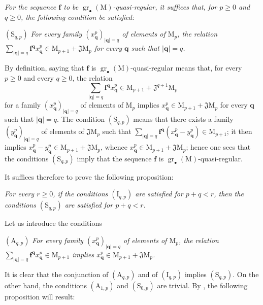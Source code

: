 \begin{env}[19.5.5.2]
\label{IV.19.5.5.2}
\emph{For the sequence $\mathbf{f}$ to be $\operatorname{gr}_\bullet(\mathrm{M})$-quasi-regular, it suffices that, for $p\geqslant 0$ and $q\geqslant 0$, the following condition be satisfied:}

$(\mathrm{S}_{q,p})$ \emph{For every family $(x_\mathbf{q}^p)_{|\mathbf{q}|=q}$ of elements of $\mathrm{M}_p$, the relation $\sum_{|\mathbf{q}|=q}\mathbf{f}^\mathbf{q} x_\mathbf{q}^p\in\mathrm{M}_{p+1}+\mathfrak{J}\mathrm{M}_p$ \emph{for every $\mathbf{q}$ such that $|\mathbf{q}|=q$.}}

By definition, saying that $\mathbf{f}$ is $\operatorname{gr}_\bullet(\mathrm{M})$-quasi-regular means that, for every $p\geqslant 0$ and every $q\geqslant 0$, the relation
\[
  \textstyle\sum_{|\mathbf{q}|=q}\mathbf{f}^\mathbf{q} x_\mathbf{q}^p\in\mathrm{M}_{p+1}+\mathfrak{J}^{q+1}\mathrm{M}_p
\]
for a family $(x_\mathbf{q}^p)_{|\mathbf{q}|=q}$ of elements of $\mathrm{M}_p$ implies $x_\mathbf{q}^p\in\mathrm{M}_{p+1}+\mathfrak{J}\mathrm{M}_p$ for every $\mathbf{q}$ such that $|\mathbf{q}|=q$. The condition $(\mathrm{S}_{q,p})$ means that there exists a family $(y_\mathbf{q}^p)_{|\mathbf{q}|=q}$ of elements of $\mathfrak{J}\mathrm{M}_p$ such that $\sum_{|\mathbf{q}|=q}\mathbf{f}^\mathbf{q}(x_\mathbf{q}^p-y_\mathbf{q}^p)\in\mathrm{M}_{p+1}$; it then implies $x_\mathbf{q}^p-y_\mathbf{q}^p\in\mathrm{M}_{p+1}+\mathfrak{J}\mathrm{M}_p$, whence $x_\mathbf{q}^p\in\mathrm{M}_{p+1}+\mathfrak{J}\mathrm{M}_p$; hence one sees that the conditions $(\mathrm{S}_{q,p})$ imply that the sequence $\mathbf{f}$ is $\operatorname{gr}_\bullet(\mathrm{M})$-quasi-regular.
\end{env}

It suffices therefore to prove the following proposition:

\begin{env}[19.5.5.3]
\label{IV.19.5.5.3}
\emph{For every $r\geqslant 0$, if the conditions $(\mathrm{I}_{q,p})$ are satisfied for $p+q<r$, then the conditions $(\mathrm{S}_{q,p})$ are satisfied for $p+q<r$.}

Let us introduce the conditions

$(\mathrm{A}_{q,p})$ \emph{For every family $(x_\mathbf{q}^p)_{|\mathbf{q}|=q}$ of elements of $\mathrm{M}_p$, the relation $\sum_{|\mathbf{q}|=q}\mathbf{f}^\mathbf{q} x_\mathbf{q}^p\in\mathrm{M}_{p+1}$ implies $x_\mathbf{q}^p\in\mathrm{M}_{p+1}+\mathfrak{J}\mathrm{M}_p$.}

It is clear that the conjunction of $(\mathrm{A}_{q,p})$ and of $(\mathrm{I}_{q,p})$ implies $(\mathrm{S}_{q,p})$. On the other hand, the conditions $(\mathrm{A}_{1,p})$ and $(\mathrm{S}_{0,p})$ are trivial. By , the following proposition will result:
\end{env}

